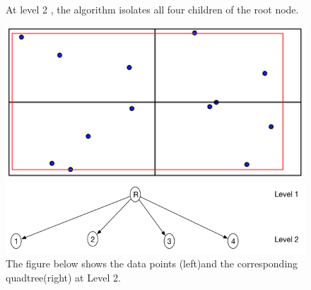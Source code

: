 \documentclass{article}
\begin{document}
\begin{figure}[ht]

At level 2 , the algorithm isolates all four children of the root node.
\caption{The figure below shows the data points (left)and the corresponding quadtree(right) at Level 2.}
  \centering
  \begin{minipage}[b]{0.35\textwidth}
    \includegraphics[width=\textwidth]{4Quad1_2}  
  \end{minipage}
  \hfill
  \begin{minipage}[b]{0.6\textwidth}
    \includegraphics[width=\textwidth]{1_1Quad_2_tree}
  \end{minipage}
\end{figure}
\end{document}
